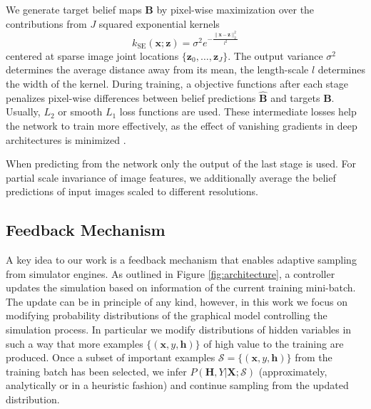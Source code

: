 \documentclass[conference]{IEEEtran}
\begin{document}
    We generate target belief maps $\mathbf{B}$ by pixel-wise maximization over the contributions from $J$ squared exponential kernels
    \begin{equation}
        k_{\textrm{SE}}(\mathbf{x};\mathbf{z}) = \sigma^2e^{-\frac{\lVert \mathbf{x} - \mathbf{z} \rVert^2_2}{l^2}}
    \end{equation}
    centered at sparse image joint locations $\{\mathbf{z}_0,\ldots,\mathbf{z}_J\}$. The output variance $\sigma^2$ determines the average distance away from its mean, the length-scale $l$ determines the width of the kernel. During training, a objective functions after each stage penalizes pixel-wise differences between belief predictions $\hat{\mathbf{B}}$ and targets $\mathbf{B}$. Usually, $L_2$ or smooth $L_1$ loss functions are used. These intermediate losses help the network to train more effectively, as the effect of vanishing gradients in deep architectures is minimized \cite{newell2016stacked, wei2016convolutional}. 
    
    When predicting from the network only the output of the last stage is used. For partial scale invariance of image features, we additionally average the belief predictions of input images scaled to different resolutions.

\subsection{Feedback Mechanism}
    A key idea to our work is a feedback mechanism that enables adaptive sampling from simulator engines. As outlined in Figure \ref{fig:architecture}, a controller updates the simulation based on information of the current training mini-batch. The update can be in principle of any kind, however, in this work we focus on modifying probability distributions of the graphical model controlling the simulation process. In particular we modify distributions of hidden variables in such a way that more examples $\{(\textbf{x},y,\textbf{h})\}$ of high value to the training are produced. Once a subset of important examples $\mathcal{S} = \{(\textbf{x},y,\textbf{h})\}$ from the training batch has been selected, we infer $P(\textbf{H},Y \lvert \textbf{X};\mathcal{S})$ (approximately, analytically or in a heuristic fashion) and continue sampling from the updated distribution.
\end{document}
